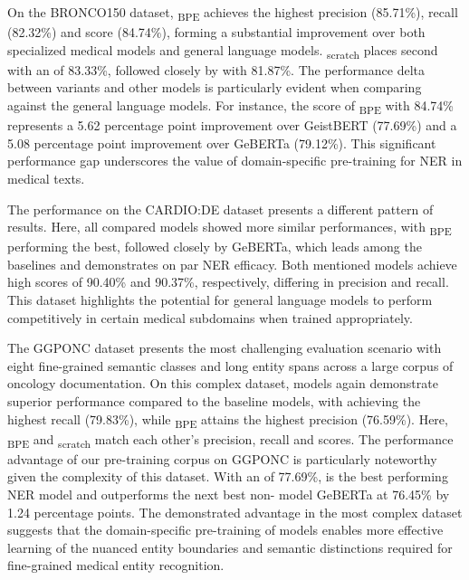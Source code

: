 On the BRONCO150 dataset, \ChristBERT\textsubscript{BPE} achieves the highest
precision (85.71\%), recall (82.32\%) and \ff{} score (84.74\%), forming a
substantial improvement over both specialized medical models and general
language models. \ChristBERT\textsubscript{scratch} places second with an \ff{}
of 83.33\%, followed closely by \ChristBERT{} with 81.87\%. The performance
delta between \ChristBERT{} variants and other models is particularly evident
when comparing against the general language models. For instance, the \ff{}
score of \ChristBERT\textsubscript{BPE} with 84.74\% represents a 5.62
percentage point improvement over GeistBERT (77.69\%) and a 5.08 percentage
point improvement over GeBERTa (79.12\%). This significant performance gap
underscores the value of domain-specific pre-training for NER in medical texts.

The performance on the CARDIO:DE dataset presents a different pattern of
results. Here, all compared models showed more similar performances, with
\ChristBERT\textsubscript{BPE} performing the best, followed closely by GeBERTa,
which leads among the baselines and demonstrates on par NER efficacy. Both
mentioned models achieve high \ff{} scores of 90.40\% and 90.37\%, respectively,
differing in precision and recall. This dataset highlights the potential for
general language models to perform competitively in certain medical subdomains
when trained appropriately.

The GGPONC dataset presents the most challenging evaluation scenario with eight
fine-grained semantic classes and long entity spans across a large corpus of
oncology documentation. On this complex dataset, \ChristBERT{} models again
demonstrate superior performance compared to the baseline models, with
\ChristBERT{} achieving the highest recall (79.83\%), while
\ChristBERT\textsubscript{BPE} attains the highest precision (76.59\%). Here,
\ChristBERT\textsubscript{BPE} and \ChristBERT\textsubscript{scratch} match each
other's precision, recall and \ff{} scores. The performance advantage of our
pre-training corpus on GGPONC is particularly noteworthy given the complexity of
this dataset. With an \ff{} of 77.69\%, \ChristBERT{} is the best performing NER
model and outperforms the next best non-\ChristBERT{} model GeBERTa at 76.45\%
by 1.24 percentage points. The demonstrated advantage in the most complex
dataset suggests that the domain-specific pre-training of \ChristBERT{} models
enables more effective learning of the nuanced entity boundaries and semantic
distinctions required for fine-grained medical entity recognition.

